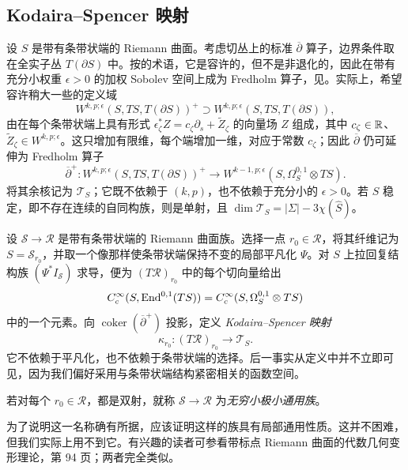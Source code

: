 \subsection{Kodaira–Spencer 映射}\label{sec:9b}
设 $S$ 是带有条带状端的 Riemann 曲面。考虑切丛上的标准 $\overline\partial$ 算子，边界条件取在全实子丛 $T(\partial S)$ 中。按的术语，它是容许的，但不是非退化的，因此在带有充分小权重 $\epsilon>0$ 的加权 Sobolev 空间上成为 Fredholm 算子，见。实际上，希望容许稍大一些的定义域
\begin{equation}\label{eq:9.2}
W^{k,p;\epsilon}(S,TS,T(\partial S))^+\supset W^{k,p;\epsilon}(S,TS,T(\partial S)),
\end{equation}
由在每个条带状端上具有形式 $\epsilon_\zeta^*Z=c_\zeta\partial_s+\widetilde Z_\zeta$ 的向量场 $Z$ 组成，其中 $c_\zeta\in\mathbb R$、$\widetilde Z_\zeta\in W^{k,p;\epsilon}$。这只增加有限维，每个端增加一维，对应于常数 $c_\zeta$；因此 $\overline\partial$ 仍可延伸为 Fredholm 算子
\begin{equation}\label{eq:9.3}
\overline\partial^+:W^{k,p;\epsilon}(S,TS,T(\partial S))^+
\longrightarrow W^{k-1,p;\epsilon}(S,\Omega_S^{0,1}\otimes TS).
\end{equation}
将其余核记为 $\mathcal T_S$；它既不依赖于 $(k,p)$，也不依赖于充分小的 $\epsilon>0$。若 $S$ 稳定，即不存在连续的自同构族，则是单射，且 $\dim\mathcal T_S=|\Sigma|-3\chi(\widehat S)$。

设 $\mathcal S\to\mathcal R$ 是带有条带状端的 Riemann 曲面族。选择一点 $r_0\in\mathcal R$，将其纤维记为 $S=\mathcal S_{r_0}$，并取一个像那样使条带状端保持不变的局部平凡化 $\Psi$。对 $S$ 上拉回复结构族 $(\Psi^*I_{\mathcal S})$ 求导，便为 $(T\mathcal R)_{r_0}$ 中的每个切向量给出
\[
C_c^\infty(S,\operatorname{End}^{0,1}(TS))=C_c^\infty(S,\Omega_S^{0,1}\otimes TS)
\]
中的一个元素。向 $\operatorname{coker}(\overline\partial^+)$ 投影，定义 \emph{Kodaira–Spencer 映射}
\begin{equation}\label{eq:9.4}
\kappa_{r_0}:(T\mathcal R)_{r_0}\longrightarrow\mathcal T_S.
\end{equation}
它不依赖于平凡化，也不依赖于条带状端的选择。后一事实从定义中并不立即可见，因为我们偏好采用与条带状端结构紧密相关的函数空间。
\begin{definition*}
若对每个 $r_0\in\mathcal R$，都是双射，就称 $\mathcal S\to\mathcal R$ 为\emph{无穷小极小通用族}。
\end{definition*}
为了说明这一名称确有所据，应该证明这样的族具有局部通用性质。这并不困难，但我们实际上用不到它。有兴趣的读者可参看带标点 Riemann 曲面的代数几何变形理论，第 94 页；两者完全类似。

